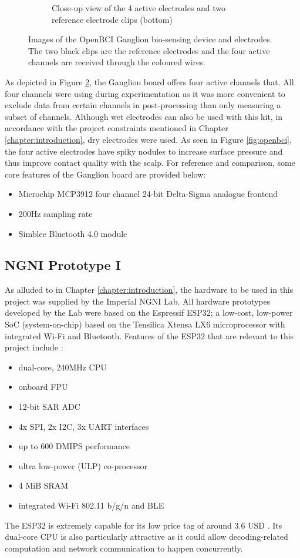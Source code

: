 \begin{figure}
\begin{subfigure}[c]{0.45\textwidth}
         \caption{Close-up view of the 4 active electrodes and two reference electrode clips (bottom)}
         \label{fig:openbci-electrodes}
     \end{subfigure}
        \caption[Images of the OpenBCI Ganglion bio-sensing device and electrodes]{Images of the OpenBCI Ganglion bio-sensing device and electrodes. The two black clips are the reference electrodes and the four active channels are received through the coloured wires.}
        \label{fig:openbci-subfigs}
\end{figure}
As depicted in Figure \ref{fig:openbci-subfigs}, the Ganglion board offers four active channels that. All four channels were using during experimentation as it was more convenient to exclude data from certain channels in post-processing than only measuring a subset of channels. Although wet electrodes can also be used with this kit, in accordance with the project constraints mentioned in Chapter \ref{chapter:introduction}, dry electrodes were used. As seen in Figure \ref{fig:openbci}, the four active electrodes have spiky nodules to increase surface pressure and thus improve contact quality with the scalp. For reference and comparison, some core features of the Ganglion board are provided below:
\begin{itemize}
    \item Microchip MCP3912 four channel 24-bit Delta-Sigma analogue frontend
    \item 200Hz sampling rate
    \item Simblee Bluetooth 4.0 module
\end{itemize}

\subsection{NGNI Prototype I}
\label{subsection:electronic-hardware-proto}
As alluded to in Chapter \ref{chapter:introduction}, the hardware to be used in this project was supplied by the Imperial NGNI Lab. All hardware prototypes developed by the Lab were based on the Espressif ESP32; a low-cost, low-power SoC (system-on-chip) based on the Tensilica Xtensa LX6 microprocessor with integrated Wi-Fi and Bluetooth. Features of the ESP32 that are relevant to this project include \cite{esp32-digikey}:
\begin{itemize}
    \item dual-core, 240MHz CPU
    \item onboard FPU
    \item 12-bit SAR ADC
    \item 4x SPI, 2x I2C, 3x UART interfaces
    \item up to 600 DMIPS performance
    \item ultra low-power (ULP) co-processor
    \item 4 MiB SRAM
    \item integrated Wi-Fi 802.11 b/g/n and BLE
\end{itemize}
The ESP32 is extremely capable for its low price tag of around 3.6 USD \cite{esp32-digikey}. Its dual-core CPU is also particularly attractive as it could allow decoding-related computation and network communication to happen concurrently.

